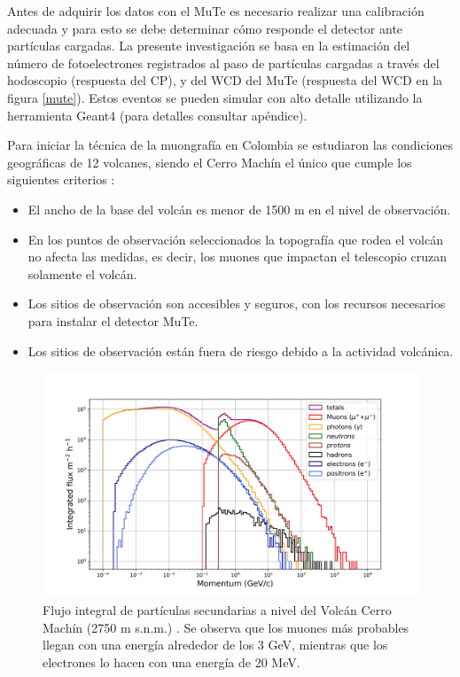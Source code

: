 \documentclass[12pt,oneside,openany,letter]{book}
\begin{document}
Antes de adquirir los datos con el MuTe es necesario realizar una calibración adecuada y para esto se debe determinar cómo responde el detector ante partículas cargadas. La presente investigación se basa en la estimación del número de fotoelectrones registrados al paso de partículas cargadas a trav\'es del hodoscopio (respuesta del CP), y del WCD del MuTe (respuesta del WCD en la figura \ref{mute}). Estos eventos se pueden simular con alto detalle utilizando la herramienta Geant4 \cite{Geant4} (para detalles consultar apéndice).

Para iniciar la técnica de la muongrafía en Colombia se estudiaron las condiciones geogr\'aficas de 12 volcanes, siendo el Cerro Machín el \'unico que cumple los siguientes criterios \cite{MuTeSites}:
\begin{itemize}
\item El ancho de la base del volcán es menor de 1500 m en el nivel de observación.
\item En los puntos de observación seleccionados la topografía que rodea el volcán no afecta las medidas, es decir, los muones que impactan el telescopio cruzan solamente el volcán.
\item Los sitios de observación son accesibles y seguros, con los recursos necesarios para instalar el detector MuTe. 
\item Los sitios de observación están fuera de riesgo debido a la actividad volcánica. 
\end{itemize}
\begin{figure}[h!]
    \centering
        \includegraphics[scale=0.55]{images/countsenergies.png}
   \caption[Flujo integral de partículas secundarias a nivel del Volcán Cerro Machín]{Flujo integral de partículas secundarias a nivel del Volcán Cerro Machín (2750 m s.n.m.) \cite{MuTeSites}. Se observa que los muones más probables llegan con una energía alrededor de los 3 GeV, mientras que los electrones lo hacen con una energía de 20 MeV.}\label{flujo}
\end{figure}
\end{document}
